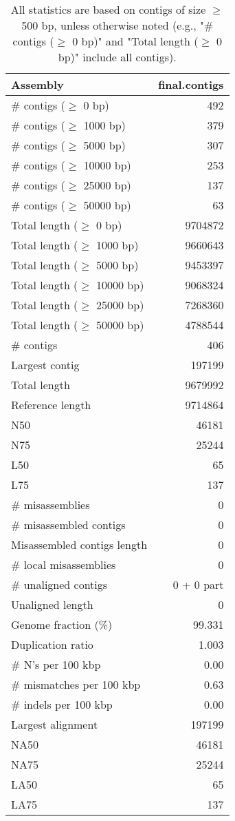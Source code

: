 \documentclass[12pt,a4paper]{article}
\begin{document}
\begin{table}[ht]
\begin{center}
\caption{All statistics are based on contigs of size $\geq$ 500 bp, unless otherwise noted (e.g., "\# contigs ($\geq$ 0 bp)" and "Total length ($\geq$ 0 bp)" include all contigs).}
\begin{tabular}{|l*{1}{|r}|}
\hline
Assembly & final.contigs \\ \hline
\# contigs ($\geq$ 0 bp) & 492 \\ \hline
\# contigs ($\geq$ 1000 bp) & 379 \\ \hline
\# contigs ($\geq$ 5000 bp) & 307 \\ \hline
\# contigs ($\geq$ 10000 bp) & 253 \\ \hline
\# contigs ($\geq$ 25000 bp) & 137 \\ \hline
\# contigs ($\geq$ 50000 bp) & 63 \\ \hline
Total length ($\geq$ 0 bp) & 9704872 \\ \hline
Total length ($\geq$ 1000 bp) & 9660643 \\ \hline
Total length ($\geq$ 5000 bp) & 9453397 \\ \hline
Total length ($\geq$ 10000 bp) & 9068324 \\ \hline
Total length ($\geq$ 25000 bp) & 7268360 \\ \hline
Total length ($\geq$ 50000 bp) & 4788544 \\ \hline
\# contigs & 406 \\ \hline
Largest contig & 197199 \\ \hline
Total length & 9679992 \\ \hline
Reference length & 9714864 \\ \hline
N50 & 46181 \\ \hline
N75 & 25244 \\ \hline
L50 & 65 \\ \hline
L75 & 137 \\ \hline
\# misassemblies & 0 \\ \hline
\# misassembled contigs & 0 \\ \hline
Misassembled contigs length & 0 \\ \hline
\# local misassemblies & 0 \\ \hline
\# unaligned contigs & 0 + 0 part \\ \hline
Unaligned length & 0 \\ \hline
Genome fraction (\%) & 99.331 \\ \hline
Duplication ratio & 1.003 \\ \hline
\# N's per 100 kbp & 0.00 \\ \hline
\# mismatches per 100 kbp & 0.63 \\ \hline
\# indels per 100 kbp & 0.00 \\ \hline
Largest alignment & 197199 \\ \hline
NA50 & 46181 \\ \hline
NA75 & 25244 \\ \hline
LA50 & 65 \\ \hline
LA75 & 137 \\ \hline
\end{tabular}
\end{center}
\end{table}
\end{document}
